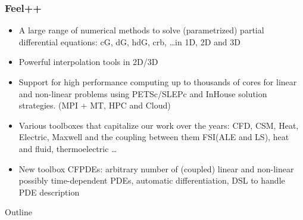 \documentclass{beamer}
\begin{document}
\begin{frame}
	\frametitle{Feel++}

	\begin{itemize}
		\item A large range of numerical methods to solve (parametrized) partial differential
		equations: cG, dG, hdG, crb, \ldots in 1D, 2D and 3D
		\item Powerful interpolation tools in 2D/3D 
		\item  Support for high performance computing up to thousands of cores
		for linear and non-linear problems using  PETSc/SLEPc and
		InHouse solution strategies. (MPI + MT, HPC and Cloud)
		\item Various toolboxes that capitalize our work over the years: CFD, CSM, Heat, Electric, Maxwell and the coupling between them FSI(ALE and LS), heat and fluid, thermoelectric \ldots
		\item New toolbox CFPDEs: arbitrary number of (coupled) linear and non-linear possibly time-dependent PDEs, automatic differentiation, DSL to handle PDE description
	\end{itemize}

\end{frame}
\begin{frame}{Outline}
	\tableofcontents
\end{frame}
\end{document}
